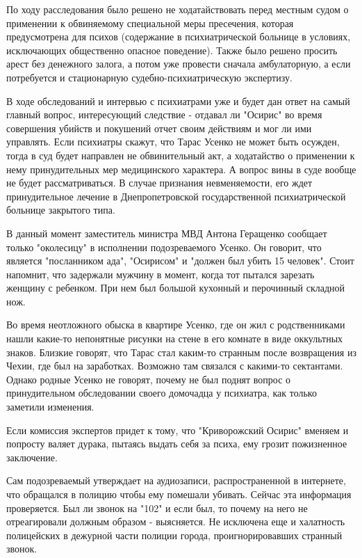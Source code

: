 По ходу расследования было решено не ходатайствовать перед местным судом о
применении к обвиняемому специальной меры пресечения, которая предусмотрена для
психов (содержание в психиатрической больнице в условиях, исключающих
общественно опасное поведение). Также было решено просить арест без денежного
залога, а потом уже провести сначала амбулаторную, а если потребуется и
стационарную судебно-психиатрическую экспертизу.

В ходе обследований и интервью с психиатрами уже и будет дан ответ на самый
главный вопрос, интересующий следствие - отдавал ли "Осирис" во время
совершения убийств и покушений отчет своим действиям и мог ли ими управлять.
Если психиатры скажут, что Тарас Усенко не может быть осужден, тогда в суд
будет направлен не обвинительный акт, а ходатайство о применении к нему
принудительных мер медицинского характера. А вопрос вины в суде вообще не будет
рассматриваться. В случае признания невменяемости, его ждет принудительное
лечение в Днепропетровской государственной психиатрической больнице закрытого
типа.

В данный момент заместитель министра МВД Антона Геращенко сообщает только
"околесицу" в исполнении подозреваемого Усенко. Он говорит, что является
"посланником ада", "Осирисом" и "должен был убить 15 человек". Стоит напомнит,
что задержали мужчину в момент, когда тот пытался зарезать женщину с ребенком.
При нем был большой кухонный и перочинный складной нож.

Во время неотложного обыска в квартире Усенко, где он жил с родственниками
нашли какие-то непонятные рисунки на стене в его комнате в виде оккультных
знаков. Близкие говорят, что Тарас стал каким-то странным после возвращения из
Чехии, где был на заработках. Возможно там связался с какими-то сектантами.
Однако родные Усенко не говорят, почему не был поднят вопрос о принудительном
обследовании своего домочадца у психиатра, как только заметили изменения.

Если комиссия экспертов придет к тому, что "Криворожский Осирис" вменяем и
попросту валяет дурака, пытаясь выдать себя за психа, ему грозит пожизненное
заключение.

Сам подозреваемый утверждает на аудиозаписи, распространенной в интернете, что
обращался в полицию чтобы ему помешали убивать. Сейчас эта информация
проверяется. Был ли звонок на "102" и если был, то почему на него не
отреагировали должным образом - выясняется. Не исключена еще и халатность
полицейских в дежурной части полиции города, проигнорировавших странный звонок.

